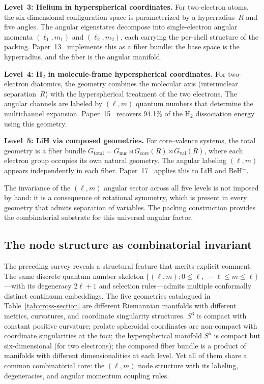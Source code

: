 \documentclass[aps,prl,reprint,amsmath,amssymb]{revtex4-2}
\begin{document}
\textbf{Level~3: Helium in hyperspherical coordinates.}
For two-electron atoms, the six-dimensional configuration space is
parameterized by a hyperradius~$R$ and five angles.  The angular
eigenstates decompose into single-electron angular momenta
$(\ell_1, m_1)$ and $(\ell_2, m_2)$, each carrying the per-shell
structure of the packing.  Paper~13~\cite{paper13} implements this as
a fiber bundle: the base space is the hyperradius, and the fiber is
the angular manifold.

\textbf{Level~4: H$_2$ in molecule-frame hyperspherical coordinates.}
For two-electron diatomics, the geometry combines the molecular axis
(internuclear separation~$R$) with the hyperspherical treatment of the
two electrons.  The angular channels are labeled by $(\ell, m)$
quantum numbers that determine the multichannel expansion.
Paper~15~\cite{paper15} recovers 94.1\% of the H$_2$ dissociation
energy using this geometry.

\textbf{Level~5: LiH via composed geometries.}
For core--valence systems, the total geometry is a fiber bundle
$G_{\mathrm{total}} = G_{\mathrm{nuc}} \rtimes G_{\mathrm{core}}(R)
\rtimes G_{\mathrm{val}}(R)$, where each electron group occupies its
own natural geometry.  The angular labeling $(\ell, m)$ appears
independently in each fiber.  Paper~17~\cite{paper17} applies this to
LiH and BeH$^+$.

\medskip

The invariance of the $(\ell, m)$ angular sector across all five
levels is not imposed by hand: it is a consequence of rotational
symmetry, which is present in every geometry that admits separation of
variables.  The packing construction provides the combinatorial
substrate for this universal angular factor.

\subsection{The node structure as combinatorial invariant}
\label{sec:combinatorial_invariant}

The preceding survey reveals a structural feature that merits explicit
comment.  The same discrete quantum number skeleton
$\{(\ell, m) : 0 \leq \ell, \; -\ell \leq m \leq \ell\}$---with its
degeneracy $2\ell + 1$ and selection rules---admits multiple conformally
distinct continuum embeddings.  The five geometries catalogued in
Table~\ref{tab:cross-section} are different Riemannian manifolds with
different metrics, curvatures, and coordinate singularity structures.
$S^3$ is compact with constant positive curvature; prolate spheroidal
coordinates are non-compact with coordinate singularities at the foci;
the hyperspherical manifold $S^5$ is compact but six-dimensional (for two electrons); the
composed fiber bundle is a product of manifolds with different
dimensionalities at each level.  Yet all of them share a common
combinatorial core: the $(\ell, m)$ node structure with its labeling,
degeneracies, and angular momentum coupling rules.
\end{document}
